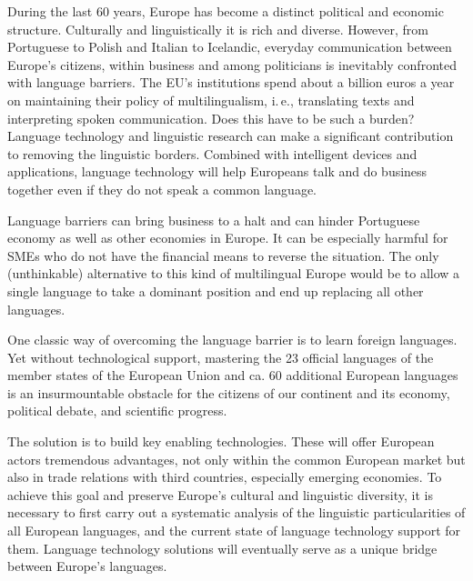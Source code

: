 \documentclass[]{../metanetpaper}
\begin{document}
\begin{multicols}{2}

During the last 60 years, Europe has become a distinct political and economic structure. Culturally and linguistically it is rich and diverse. However, from Portuguese to Polish and Italian to Icelandic, everyday communication between Europe’s citizens, within business and among politicians is inevitably confronted with language barriers. The EU's institutions spend about a billion euros a year on maintaining their policy of multilingualism, i.\,e., translating texts and interpreting spoken communication. Does this have to be such a burden? Language technology and linguistic research can make a significant contribution to removing the linguistic borders. Combined with intelligent devices and applications, language technology will help Europeans talk and do business together even if they do not speak a common language. 


Language barriers can bring business to a halt and can hinder Portuguese economy as well as other economies in Europe. It can be especially harmful for SMEs who do not have the financial means to reverse the situation. The only (unthinkable) alternative to this kind of multilingual Europe would be to allow a single language to take a dominant position and end up replacing all other languages. 

    One classic way of overcoming the language barrier is to learn foreign languages. Yet without technological support, mastering the 23 official languages of the member states of the European Union and ca. 60 additional European languages is an insurmountable obstacle for the citizens of our continent and its economy, political debate, and scientific progress.  

   The solution is to build key enabling technologies. These will offer European actors tremendous advantages, not only within the common European market but also in trade relations with third countries, especially emerging economies.  To achieve this goal and preserve Europe’s cultural and linguistic diversity, it is necessary to first carry out a systematic analysis of the linguistic particularities of all European languages, and the current state of language technology support for them. Language technology solutions will eventually serve as a unique bridge between Europe’s languages. 



\end{multicols}
\end{document}
